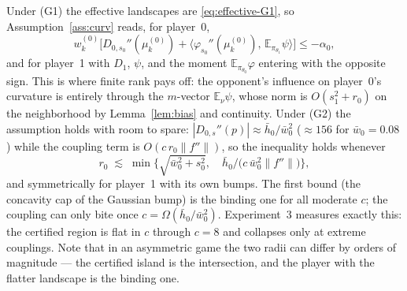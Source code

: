 \documentclass[11pt]{article}
\theoremstyle{definition}
\newcommand{\E}{\mathbb{E}}
\begin{document}
Under (G1) the effective landscapes are \eqref{eq:effective-G1}, so
Assumption~\ref{ass:curv} reads, for player~0,
\[
  w^{(0)}_k\Big[ D_{0,s_0}''(\mu^{(0)}_k)
  + \big\langle \varphi_{s_0}''(\mu^{(0)}_k),\, \E_{\pi_{\theta_1}}
  \psi \big\rangle \Big] \le -\alpha_0 ,
\]
and for player~1 with $D_1$, $\psi$, and the moment $\E_{\pi_{\theta_0}}
\varphi$ entering with the opposite sign. This is where finite rank pays off:
the opponent's influence on player~0's curvature is entirely through the
$m$-vector $\E_\nu \psi$, whose norm is $O(s_1^2 + r_0)$ on the neighborhood by
Lemma~\ref{lem:bias} and continuity. Under (G2) the assumption holds with room
to spare: $|D_{0,s}''(p)| \approx \bar h_0 / \bar w_0^2$ ($\approx 156$ for
$\bar w_0 = 0.08$) while the coupling term is $O(c\, r_0 \|f''\|)$, so the
inequality holds whenever
\[
  r_0 \;\lesssim\; \min\Big\{ \sqrt{\bar w_0^2 + s_0^2},\quad
  \bar h_0 / \big(c\, \bar w_0^2 \|f''\|\big) \Big\},
\]
and symmetrically for player~1 with its own bumps. The first bound (the
concavity cap of the Gaussian bump) is the binding one for all moderate $c$;
the coupling can only bite once $c = \Omega(\bar h_0 / \bar w_0^2)$.
Experiment~3 measures exactly this: the certified region is flat in $c$ through
$c = 8$ and collapses only at extreme couplings. Note that in an asymmetric
game the two radii can differ by orders of magnitude --- the certified island is
the intersection, and the player with the flatter landscape is the binding one.
\end{document}
